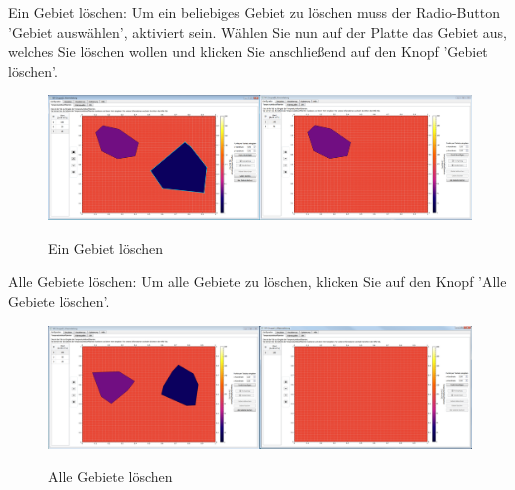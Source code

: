 \noindent
Ein Gebiet löschen: Um ein beliebiges Gebiet zu löschen muss der Radio-Button 'Gebiet auswählen', aktiviert sein. Wählen Sie nun auf der Platte das Gebiet aus, welches Sie löschen wollen und klicken Sie anschließend auf den Knopf 'Gebiet löschen'.
\begin{figure}[H]
\centering
\includegraphics[scale=.25]{Benutzerdokumentation/GebietLoeschen.png}\\
\caption{Ein Gebiet löschen}
\label{GebietLoeschen}
\end{figure}

\newpage
\noindent
Alle Gebiete löschen: Um alle Gebiete zu löschen, klicken Sie auf den Knopf 'Alle Gebiete löschen'.
\begin{figure}[H]
\centering
\includegraphics[scale=.25]{Benutzerdokumentation/AlleGebieteLoeschen.png}\\
\caption{Alle Gebiete löschen}
\label{AlleGebieteLoeschen}
\end{figure}

